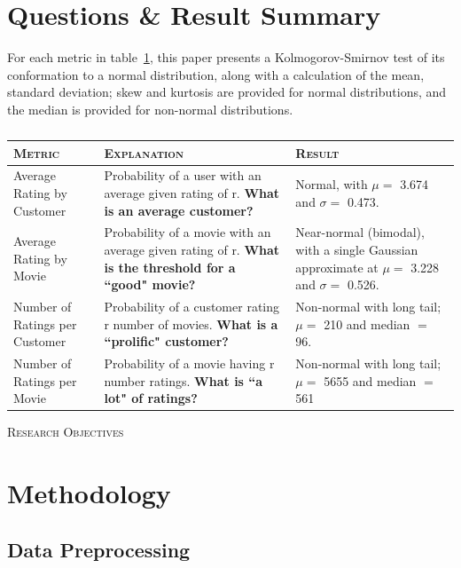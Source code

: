 \documentclass{acmtog}
\begin{document}
\medskip

\section{Questions \& Result Summary}

For each metric in table~\ref{table:one}, this paper presents a Kolmogorov-Smirnov test of its conformation to a normal distribution, along with a calculation of the mean, standard deviation; skew and kurtosis are provided for normal distributions, and the median is provided for non-normal distributions.

\begin{table}
\begin{center}
    \begin{tabular}{ | p{1.6cm} | p{2.8cm} | p{2.8cm} |}
    \hline
    \textsc{Metric} & \textsc{Explanation} & \textsc{Result} \\ \hline
    Average Rating by Customer &  Probability of a user with an average given rating of r. \textbf{What is an average customer?} & Normal, with $\mu=$ 3.674 and $\sigma=$ 0.473. \\ \hline
    Average Rating by Movie & Probability of a movie with an average given rating of r. \textbf{What is the threshold for a ``good" movie?}  & Near-normal (bimodal), with a single Gaussian approximate at $\mu=$ 3.228 and $\sigma=$ 0.526. \\ \hline
   Number of Ratings per Customer & Probability of a customer rating r number of movies. \textbf{What is a ``prolific" customer?} & Non-normal with long tail; $\mu=$ 210 and median $=$ 96. \\ \hline
    Number of Ratings per Movie &  Probability of a movie having r number ratings. \textbf{What is ``a lot" of ratings?} & Non-normal with long tail; $\mu=$ 5655 and median $=$ 561  \\
    \hline
    \end{tabular}
\textsc{Research Objectives}
\end{center}
\caption{}
\label{table:one}
\end{table}

\medskip

\section{Methodology}

\subsection{Data Preprocessing}
\end{document}
